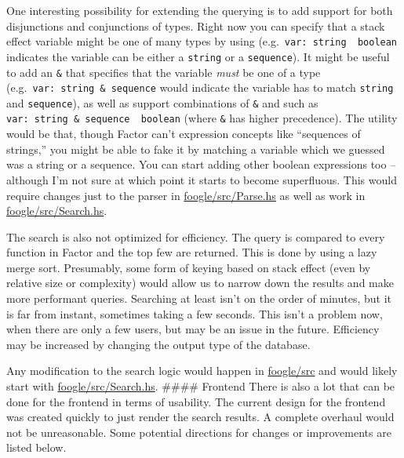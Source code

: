 \documentclass[
]{article}
\begin{document}
One interesting possibility for extending the querying is to add support
for both disjunctions and conjunctions of types. Right now you can
specify that a stack effect variable might be one of many types by using
\texttt{\textbar{}} (e.g.~\texttt{var:\ string\ \textbar{}\ boolean}
indicates the variable can be either a \texttt{string} or a
\texttt{sequence}). It might be useful to add an \texttt{\&} that
specifies that the variable \emph{must} be one of a type
(e.g.~\texttt{var:\ string\ \&\ sequence} would indicate the variable
has to match \texttt{string} and \texttt{sequence}), as well as support
combinations of \texttt{\&} and \texttt{\textbar{}} such as
\texttt{var:\ string\ \&\ sequence\ \textbar{}\ boolean} (where
\texttt{\&} has higher precedence). The utility would be that, though
Factor can't expression concepts like ``sequences of strings,'' you
might be able to fake it by matching a variable which we guessed was a
string or a sequence. You can start adding other boolean expressions too
-- although I'm not sure at which point it starts to become superfluous.
This would require changes just to the parser in
\href{https://github.com/factor-hmc/foogle/blob/master/src/Parse.hs}{foogle/src/Parse.hs}
as well as work in
\href{https://github.com/factor-hmc/foogle/blob/master/src/Search.hs}{foogle/src/Search.hs}.

The search is also not optimized for efficiency. The query is compared
to every function in Factor and the top few are returned. This is done
by using a lazy merge sort. Presumably, some form of keying based on
stack effect (even by relative size or complexity) would allow us to
narrow down the results and make more performant queries. Searching at
least isn't on the order of minutes, but it is far from instant,
sometimes taking a few seconds. This isn't a problem now, when there are
only a few users, but may be an issue in the future. Efficiency may be
increased by changing the output type of the database.

Any modification to the search logic would happen in
\href{https://github.com/factor-hmc/foogle/tree/master/src}{foogle/src}
and would likely start with
\href{https://github.com/factor-hmc/foogle/blob/master/src/Search.hs}{foogle/src/Search.hs}.
\#\#\#\# Frontend There is also a lot that can be done for the frontend
in terms of usability. The current design for the frontend was created
quickly to just render the search results. A complete overhaul would not
be unreasonable. Some potential directions for changes or improvements
are listed below.
\end{document}

